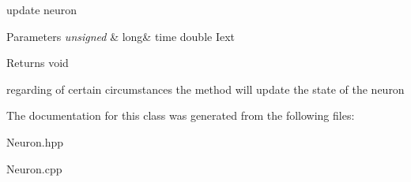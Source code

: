 update neuron 


\begin{DoxyParams}{Parameters}
{\em unsigned} & long\& time double Iext \\
\hline
\end{DoxyParams}
\begin{DoxyReturn}{Returns}
void
\end{DoxyReturn}
regarding of certain circumstances the method will update the state of the neuron 

The documentation for this class was generated from the following files\-:\begin{DoxyCompactItemize}
\item 
Neuron.\-hpp\item 
Neuron.\-cpp\end{DoxyCompactItemize}
